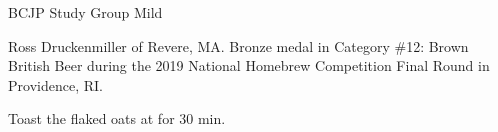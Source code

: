 \documentclass[parskip=half,fontsize=9pt,oneside]{scrbook}
\begin{document}
\mainmatter


\begin{recipe}{BCJP Study Group Mild}

\begin{aboutblock}
Ross Druckenmiller of Revere, MA. Bronze medal in Category \#12: Brown British
Beer during the 2019 National Homebrew Competition Final Round in Providence, RI.
\sourceaha
\end{aboutblock}


\begin{methodandtiming}

\begin{mashsteps}
\end{mashsteps}

\begin{fermentationsteps}
\end{fermentationsteps}

\begin{directions}
Toast the flaked oats at  for 30 min.
\end{directions}

\end{methodandtiming}

\recipebreak

\begin{ingredientsblock}

\begin{malts}
\end{malts}

\begin{hops}
\end{hops}


\end{ingredientsblock}

\end{recipe}


\end{document}
